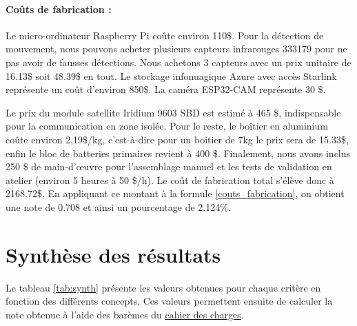 \paragraph{Coûts de fabrication :}
Le micro-ordinateur Raspberry Pi coûte environ 110\$.
Pour la détection de mouvement, nous pouvons acheter plusieurs capteurs infrarouges 333179 pour ne pas avoir de fausses détections.
Nous achetons 3 capteurs avec un prix unitaire de 16.13\$ soit 48.39\$ en tout.
Le stockage infonuagique Azure avec accès Starlink représente un coût d’environ 850\$.
La caméra ESP32-CAM représente 30 \$.

\bigskip
Le prix du module satellite Iridium 9603 SBD est estimé à 465 \$, indispensable pour la communication en zone isolée.
Pour le reste, le boîtier en aluminium coûte environ 2,19\$/kg, c’est-à-dire pour un boitier de 7kg le prix sera de 15.33\$, enfin le bloc de batteries primaires revient à 400 \$.
Finalement, nous avons inclus 250 \$ de main-d’œuvre pour l'assemblage manuel et les tests de validation en atelier (environ 5 heures à 50 \$/h).
Le coût de fabrication total s’élève donc à 2168.72\$. En appliquant ce montant à la formule \ref{couts_fabrication}, on obtient une note de 0.708 et ainsi un pourcentage de 2.124\%.



\section{Synthèse des résultats}
Le tableau \ref{tab:synth} présente les valeurs obtenues pour chaque critère en fonction des différents concepts.
Ces valeurs permettent ensuite de calculer la note obtenue à l'aide des barèmes du \hyperref[s:cahier_des_charges]{cahier des charges}.

